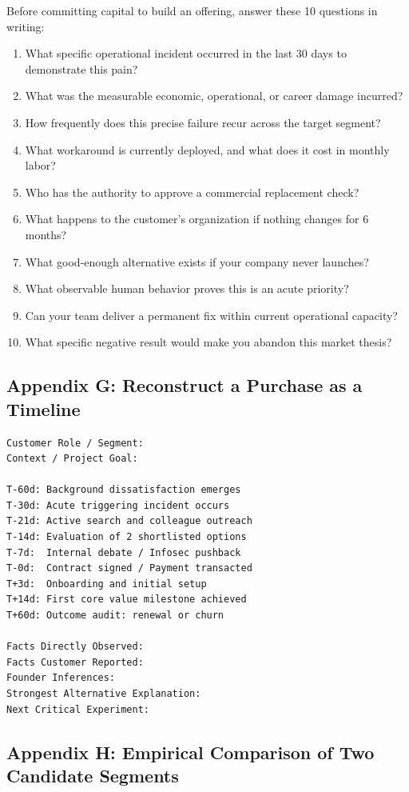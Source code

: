 Before committing capital to build an offering, answer these 10 questions in writing:
\begin{enumerate}[leftmargin=1.2em,itemsep=0.2ex]
  \item What specific operational incident occurred in the last 30 days to demonstrate this pain?
  \item What was the measurable economic, operational, or career damage incurred?
  \item How frequently does this precise failure recur across the target segment?
  \item What workaround is currently deployed, and what does it cost in monthly labor?
  \item Who has the authority to approve a commercial replacement check?
  \item What happens to the customer's organization if nothing changes for 6 months?
  \item What good-enough alternative exists if your company never launches?
  \item What observable human behavior proves this is an acute priority?
  \item Can your team deliver a permanent fix within current operational capacity?
  \item What specific negative result would make you abandon this market thesis?
\end{enumerate}

\subsection*{Appendix G: Reconstruct a Purchase as a Timeline}

\begin{verbatim}
Customer Role / Segment:
Context / Project Goal:

T-60d: Background dissatisfaction emerges
T-30d: Acute triggering incident occurs
T-21d: Active search and colleague outreach
T-14d: Evaluation of 2 shortlisted options
T-7d:  Internal debate / Infosec pushback
T-0d:  Contract signed / Payment transacted
T+3d:  Onboarding and initial setup
T+14d: First core value milestone achieved
T+60d: Outcome audit: renewal or churn

Facts Directly Observed:
Facts Customer Reported:
Founder Inferences:
Strongest Alternative Explanation:
Next Critical Experiment:
\end{verbatim}

\subsection*{Appendix H: Empirical Comparison of Two Candidate Segments}

